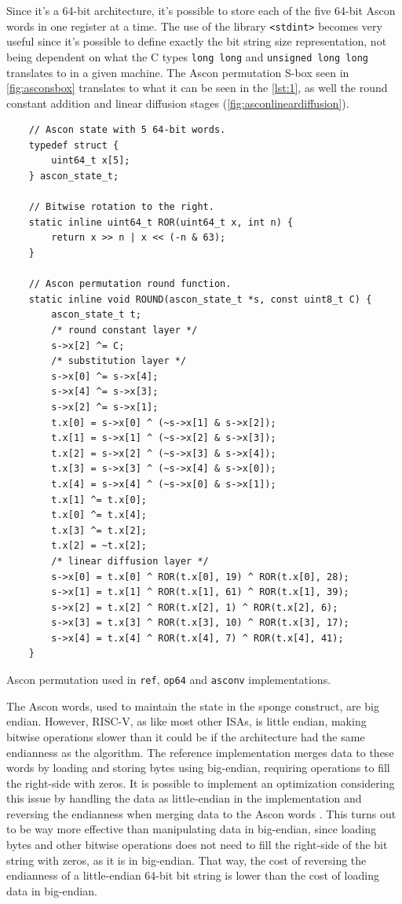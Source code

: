 \documentclass[11pt,twoside]{article}
\begin{document}
Since it's a 64-bit architecture, it's possible to store each of the five 64-bit Ascon words in one register at a time. The use of the library \texttt{<stdint>} becomes very useful since it's possible to define exactly the bit string size representation, not being dependent on what the C types \texttt{long long} and \texttt{unsigned long long} translates to in a given machine. The Ascon permutation S-box seen in \cref{fig:asconsbox} translates to what it can be seen in the \cref{lst:1}, as well the round constant addition and linear diffusion stages (\cref{fig:asconlineardiffusion}).

\begin{listing}[ht!]
  \begin{verbatim}
    // Ascon state with 5 64-bit words.
    typedef struct {
        uint64_t x[5];
    } ascon_state_t;

    // Bitwise rotation to the right.
    static inline uint64_t ROR(uint64_t x, int n) {
        return x >> n | x << (-n & 63);
    }

    // Ascon permutation round function.
    static inline void ROUND(ascon_state_t *s, const uint8_t C) {
        ascon_state_t t;
        /* round constant layer */
        s->x[2] ^= C;
        /* substitution layer */
        s->x[0] ^= s->x[4];
        s->x[4] ^= s->x[3];
        s->x[2] ^= s->x[1];
        t.x[0] = s->x[0] ^ (~s->x[1] & s->x[2]);
        t.x[1] = s->x[1] ^ (~s->x[2] & s->x[3]);
        t.x[2] = s->x[2] ^ (~s->x[3] & s->x[4]);
        t.x[3] = s->x[3] ^ (~s->x[4] & s->x[0]);
        t.x[4] = s->x[4] ^ (~s->x[0] & s->x[1]);
        t.x[1] ^= t.x[0];
        t.x[0] ^= t.x[4];
        t.x[3] ^= t.x[2];
        t.x[2] = ~t.x[2];
        /* linear diffusion layer */
        s->x[0] = t.x[0] ^ ROR(t.x[0], 19) ^ ROR(t.x[0], 28);
        s->x[1] = t.x[1] ^ ROR(t.x[1], 61) ^ ROR(t.x[1], 39);
        s->x[2] = t.x[2] ^ ROR(t.x[2], 1) ^ ROR(t.x[2], 6);
        s->x[3] = t.x[3] ^ ROR(t.x[3], 10) ^ ROR(t.x[3], 17);
        s->x[4] = t.x[4] ^ ROR(t.x[4], 7) ^ ROR(t.x[4], 41);
    }
  \end{verbatim}
  \caption{Ascon permutation used in \texttt{ref}, \texttt{op64} and \texttt{asconv} implementations.}
  \label{lst:1}
\end{listing}

The Ascon words, used to maintain the state in the sponge construct, are big endian. However, RISC-V, as like most other ISAs, is little endian, making bitwise operations slower than it could be if the architecture had the same endianness as the algorithm. The reference implementation merges data to these words by loading and storing bytes using big-endian, requiring operations to fill the right-side with zeros. It is possible to implement an optimization considering this issue by handling the data as little-endian in the implementation and reversing the endianness when merging data to the Ascon words \cite{jellema2019optimizing}. This turns out to be way more effective than manipulating data in big-endian, since loading bytes and other bitwise operations does not need to fill the right-side of the bit string with zeros, as it is in big-endian. That way, the cost of reversing the endianness of a little-endian 64-bit bit string is lower than the cost of loading data in big-endian.
\end{document}
